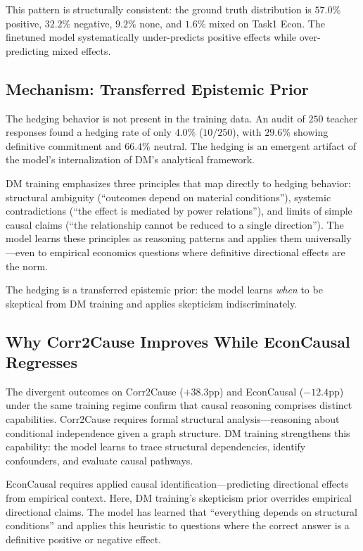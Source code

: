 \documentclass[sigconf]{acmart}
\begin{document}
This pattern is structurally consistent: the ground truth distribution is $57.0\%$ positive, $32.2\%$ negative, $9.2\%$ none, and $1.6\%$ mixed on Task1 Econ. The finetuned model systematically under-predicts positive effects while over-predicting mixed effects.

\subsection{Mechanism: Transferred Epistemic Prior}

The hedging behavior is not present in the training data. An audit of $250$ teacher responses found a hedging rate of only $4.0\%$ ($10/250$), with $29.6\%$ showing definitive commitment and $66.4\%$ neutral. The hedging is an emergent artifact of the model's internalization of DM's analytical framework.

DM training emphasizes three principles that map directly to hedging behavior: structural ambiguity (``outcomes depend on material conditions''), systemic contradictions (``the effect is mediated by power relations''), and limits of simple causal claims (``the relationship cannot be reduced to a single direction''). The model learns these principles as reasoning patterns and applies them universally---even to empirical economics questions where definitive directional effects are the norm.

The hedging is a transferred epistemic prior: the model learns \textit{when} to be skeptical from DM training and applies skepticism indiscriminately.

\subsection{Why Corr2Cause Improves While EconCausal Regresses}

The divergent outcomes on Corr2Cause ($+38.3$pp) and EconCausal ($-12.4$pp) under the same training regime confirm that causal reasoning comprises distinct capabilities. Corr2Cause requires formal structural analysis---reasoning about conditional independence given a graph structure. DM training strengthens this capability: the model learns to trace structural dependencies, identify confounders, and evaluate causal pathways.

EconCausal requires applied causal identification---predicting directional effects from empirical context. Here, DM training's skepticism prior overrides empirical directional claims. The model has learned that ``everything depends on structural conditions'' and applies this heuristic to questions where the correct answer is a definitive positive or negative effect.
\end{document}
